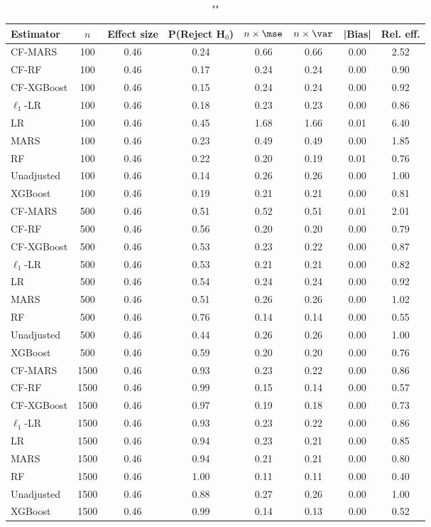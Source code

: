 \begin{table}
\centering
\caption{""}
\begin{tabular}{lccccccc}
\toprule
Estimator & $n$ & Effect size & P(Reject H$_0$) & $n\times\mse$ & $n\times \var$ & |Bias| & Rel. eff.\\ \midrule
CF-MARS & 100 & 0.46 & 0.24 & 0.66 & 0.66 & 0.00 & 2.52 \\ 
CF-RF & 100 & 0.46 & 0.17 & 0.24 & 0.24 & 0.00 & 0.90 \\ 
CF-XGBoost & 100 & 0.46 & 0.15 & 0.24 & 0.24 & 0.00 & 0.92 \\ 
$\ell_1$-LR & 100 & 0.46 & 0.18 & 0.23 & 0.23 & 0.00 & 0.86 \\ 
LR & 100 & 0.46 & 0.45 & 1.68 & 1.66 & 0.01 & 6.40 \\ 
MARS & 100 & 0.46 & 0.23 & 0.49 & 0.49 & 0.00 & 1.85 \\ 
RF & 100 & 0.46 & 0.22 & 0.20 & 0.19 & 0.01 & 0.76 \\ 
Unadjusted & 100 & 0.46 & 0.14 & 0.26 & 0.26 & 0.00 & 1.00 \\ 
XGBoost & 100 & 0.46 & 0.19 & 0.21 & 0.21 & 0.00 & 0.81 \\ \addlinespace 
CF-MARS & 500 & 0.46 & 0.51 & 0.52 & 0.51 & 0.01 & 2.01 \\ 
CF-RF & 500 & 0.46 & 0.56 & 0.20 & 0.20 & 0.00 & 0.79 \\ 
CF-XGBoost & 500 & 0.46 & 0.53 & 0.23 & 0.22 & 0.00 & 0.87 \\ 
$\ell_1$-LR & 500 & 0.46 & 0.53 & 0.21 & 0.21 & 0.00 & 0.82 \\ 
LR & 500 & 0.46 & 0.54 & 0.24 & 0.24 & 0.00 & 0.92 \\ 
MARS & 500 & 0.46 & 0.51 & 0.26 & 0.26 & 0.00 & 1.02 \\ 
RF & 500 & 0.46 & 0.76 & 0.14 & 0.14 & 0.00 & 0.55 \\ 
Unadjusted & 500 & 0.46 & 0.44 & 0.26 & 0.26 & 0.00 & 1.00 \\ 
XGBoost & 500 & 0.46 & 0.59 & 0.20 & 0.20 & 0.00 & 0.76 \\ \addlinespace 
CF-MARS & 1500 & 0.46 & 0.93 & 0.23 & 0.22 & 0.00 & 0.86 \\ 
CF-RF & 1500 & 0.46 & 0.99 & 0.15 & 0.14 & 0.00 & 0.57 \\ 
CF-XGBoost & 1500 & 0.46 & 0.97 & 0.19 & 0.18 & 0.00 & 0.73 \\ 
$\ell_1$-LR & 1500 & 0.46 & 0.93 & 0.23 & 0.22 & 0.00 & 0.86 \\ 
LR & 1500 & 0.46 & 0.94 & 0.23 & 0.21 & 0.00 & 0.85 \\ 
MARS & 1500 & 0.46 & 0.94 & 0.21 & 0.21 & 0.00 & 0.80 \\ 
RF & 1500 & 0.46 & 1.00 & 0.11 & 0.11 & 0.00 & 0.40 \\ 
Unadjusted & 1500 & 0.46 & 0.88 & 0.27 & 0.26 & 0.00 & 1.00 \\ 
XGBoost & 1500 & 0.46 & 0.99 & 0.14 & 0.13 & 0.00 & 0.52 \\
\bottomrule
\end{tabular}
\end{table}

